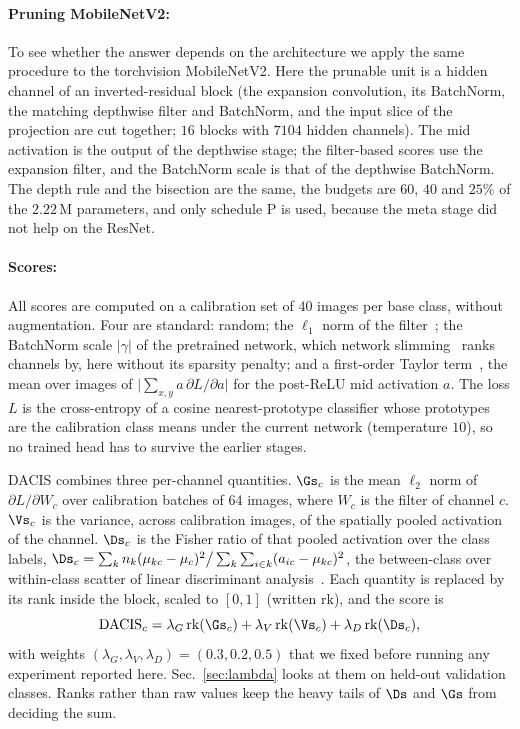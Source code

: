 \paragraph{Pruning MobileNetV2:}
To see whether the answer depends on the architecture we apply the same procedure to the torchvision MobileNetV2. Here the prunable unit is a hidden channel of an inverted-residual block (the expansion convolution, its BatchNorm, the matching depthwise filter and BatchNorm, and the input slice of the projection are cut together; $16$ blocks with $7104$ hidden channels). The mid activation is the output of the depthwise stage; the filter-based scores use the expansion filter, and the BatchNorm scale is that of the depthwise BatchNorm. The depth rule and the bisection are the same, the budgets are $60$, $40$ and $25\%$ of the $2.22$\,M parameters, and only schedule P is used, because the meta stage did not help on the ResNet.

\paragraph{Scores:}
All scores are computed on a calibration set of $40$ images per base class, without augmentation. Four are standard: random; the $\ell_1$ norm of the filter~\cite{li2017pruning}; the BatchNorm scale $|\gamma|$ of the pretrained network, which network slimming~\cite{liu2017slimming} ranks channels by, here without its sparsity penalty; and a first-order Taylor term~\cite{molchanov2017pruning}, the mean over images of $\lvert\sum_{x,y} a\,\partial L/\partial a\rvert$ for the post-ReLU mid activation $a$. The loss $L$ is the cross-entropy of a cosine nearest-prototype classifier whose prototypes are the calibration class means under the current network (temperature $10$), so no trained head has to survive the earlier stages.

DACIS combines three per-channel quantities. $\Gs_c$ is the mean $\ell_2$ norm of $\partial L/\partial W_c$ over calibration batches of $64$ images, where $W_c$ is the filter of channel $c$. $\Vs_c$ is the variance, across calibration images, of the spatially pooled activation of the channel. $\Ds_c$ is the Fisher ratio of that pooled activation over the class labels, $\Ds_c=\sum_k n_k(\mu_{kc}-\mu_c)^2\big/\sum_k\sum_{i\in k}(a_{ic}-\mu_{kc})^2$, the between-class over within-class scatter of linear discriminant analysis~\cite{fisher1936}. Each quantity is replaced by its rank inside the block, scaled to $[0,1]$ (written $\mathrm{rk}$), and the score is
\begin{equation}
  \mathrm{DACIS}_c=\lambda_G\,\mathrm{rk}(\Gs_c)+\lambda_V\,\mathrm{rk}(\Vs_c)+\lambda_D\,\mathrm{rk}(\Ds_c),
  \label{eq:dacis}
\end{equation}
with weights $(\lambda_G,\lambda_V,\lambda_D)=(0.3,0.2,0.5)$ that we fixed before running any experiment reported here. Sec.~\ref{sec:lambda} looks at them on held-out validation classes. Ranks rather than raw values keep the heavy tails of $\Ds$ and $\Gs$ from deciding the sum.

